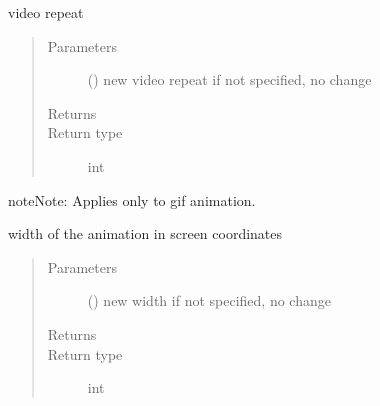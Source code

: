 \documentclass[letterpaper,10pt,english]{sphinxmanual}
\begin{document}
\begin{fulllineitems}

\begin{fulllineitems}
\label{\detokenize{Reference:salabim.Environment.video_repeat}}
video repeat
\begin{quote}\begin{description}
\item[{Parameters}] \leavevmode
{} () \textendash{} new video repeat 
if not specified, no change

\item[{Returns}] \leavevmode
{}

\item[{Return type}] \leavevmode
int

\end{description}\end{quote}

\begin{sphinxadmonition}{note}{Note:}
Applies only to gif animation.
\end{sphinxadmonition}

\end{fulllineitems}


\begin{fulllineitems}
\label{\detokenize{Reference:salabim.Environment.width}}
width of the animation in screen coordinates
\begin{quote}\begin{description}
\item[{Parameters}] \leavevmode
{} () \textendash{} new width 
if not specified, no change

\item[{Returns}] \leavevmode
{}

\item[{Return type}] \leavevmode
int

\end{description}\end{quote}

\end{fulllineitems}



\end{fulllineitems}
\end{document}
